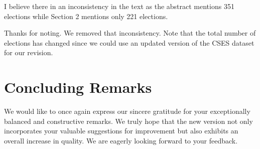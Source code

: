\documentclass[a4paper, 12pt]{scrartcl}
\theoremstyle{break}
\newenvironment{changes}{\par\color{violet}\par\addvspace{\baselineskip}}{\par\addvspace{\baselineskip}}
\begin{document}
\begin{changes}
I believe there in an inconsistency in the text as the abstract mentions 351 elections while Section 2 mentions only 221 elections.
\end{changes}

Thanks for noting. We removed that inconsistency. Note that the total number of elections has changed since we could use an updated version of the CSES dataset for our revision.


\newpage
\section{Concluding Remarks}

We would like to once again express our sincere gratitude for your exceptionally balanced and constructive remarks. We truly hope that the new version not only incorporates your valuable suggestions for improvement but also exhibits an overall increase in quality. We are eagerly looking forward to your feedback.



\end{document}

